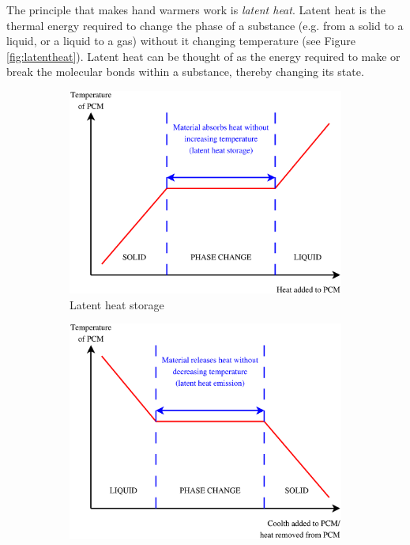 The principle that makes hand warmers work is \emph{latent heat}.
Latent heat is the thermal energy required to change the phase of a substance (e.g. from a solid to a liquid, or a liquid to a gas) without it changing temperature (see Figure \ref{fig:latentheat}).
Latent heat can be thought of as the energy required to make or break the molecular bonds within a substance, thereby changing its state.


\begin{figure}[htbp]
	\centering
	\begin{subfigure}{.49\textwidth}
		\centering
		\includegraphics[width=\textwidth]{figures/LatentHeatStorage.eps}
		\caption{Latent heat storage}
		\label{fig:latentheatstorage}
	\end{subfigure}
	\begin{subfigure}{.47\textwidth}
		\centering
		\includegraphics[width=\textwidth]{figures/LatentHeatEmission.eps}

\end{subfigure}
\end{figure}
